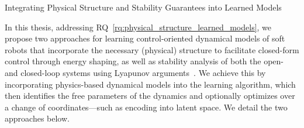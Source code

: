 \begin{contribution}\label{contrib:learned_models}
    Integrating Physical Structure and Stability Guarantees into Learned Models
\end{contribution}
In this thesis, addressing \gls{RQ}~\ref{rq:physical_structure_learned_models}, we propose two approaches for learning control-oriented dynamical models of soft robots that incorporate the necessary (physical) structure to facilitate closed-form control through energy shaping, as well as stability analysis of both the open- and closed-loop systems using Lyapunov arguments~\citep{khalil2002nonlinear}.
We achieve this by incorporating physics-based dynamical models into the learning algorithm, which then identifies the free parameters of the dynamics and optionally optimizes over a change of coordinates—such as encoding into latent space. We detail the two approaches below.


